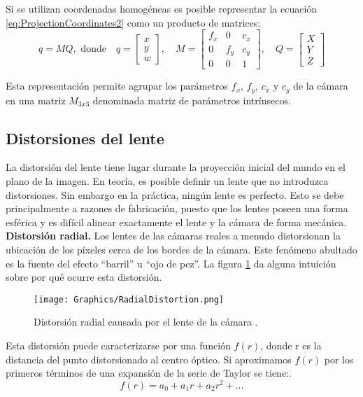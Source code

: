 Si se utilizan coordenadas homogéneas \cite{JamesAndriesStevenJohnRichard} es posible representar la ecuación \ref{eq:ProjectionCoordinates2} como un producto de matrices:
$$
    q=MQ, \text{ donde} \quad
    q = \begin{bmatrix}x\\y\\w\end{bmatrix},\quad
    M = \begin{bmatrix}
	    f_x & 0 & c_x \\
	    0 & f_y & c_y \\
	    0 & 0 & 1
        \end{bmatrix},\quad
    Q = \begin{bmatrix}X\\Y\\Z\end{bmatrix}
$$

Esta representación permite agrupar los parámetros $f_x$, $f_y$, $c_x$ y $c_y$ de la cámara en una matriz $M_{3x3}$ denominada matriz de parámetros intrínsecos.

\subsection{Distorsiones del lente}

La distorsión del lente tiene lugar durante la proyección inicial del mundo en el plano de la imagen. En teoría, es posible definir un lente que no introduzca distorsiones. Sin embargo en la práctica, ningún lente es perfecto. Esto se debe principalmente a razones de fabricación, puesto que los lentes poseen una forma esférica y es difícil alinear exactamente el lente y la cámara de forma mecánica.\\

\textbf{Distorsión radial.}
Los lentes de las cámaras reales a menudo distorsionan la ubicación de los píxeles cerca de los bordes de la cámara. Este fenómeno abultado es la fuente del efecto ``barril'' u ``ojo de pez''. La figura \ref{fig:RadialDistortion} da alguna intuición sobre por qué ocurre esta distorsión.

\begin{figure}[h!]
    \centering
    \texttt{[image: Graphics/RadialDistortion.png]}
    \caption{Distorsión radial causada por el lente de la cámara \cite{David}.}
    \label{fig:RadialDistortion}
\end{figure}

Esta distorsión puede caracterizarse por una función $f(r)$, donde r es la distancia del punto distorsionado al centro óptico. Si aproximamos $f(r)$ por los primeros términos de una expansión de la serie de Taylor \cite{Nicolas} se tiene:.
$$f(r)=a_0+a_1r+a_2r^2+\dots$$

